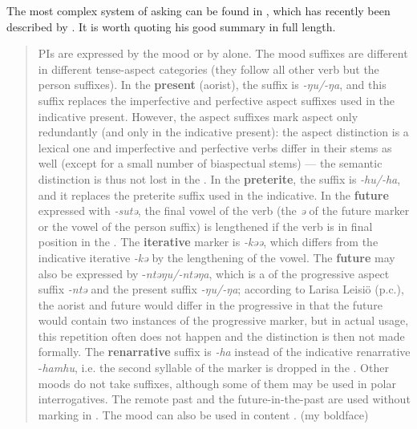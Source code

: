 \largerpage
The most complex system of asking  can be found in \textbf{}, which has recently been described by \citet[17]{Miestamo2011}. It is worth quoting his good summary in full length.

\newpage 
\begin{quote}
PIs are expressed by the  mood or by  alone. The  mood suffixes are different in different tense-aspect categories (they follow all other verb  but the person suffixes). In the \textbf{present} (aorist), the suffix is \textit{-ŋu/-ŋa}, and this suffix replaces the imperfective and perfective aspect suffixes used in the indicative present. However, the aspect suffixes mark aspect only redundantly (and only in the indicative present): the aspect distinction is a lexical one and imperfective and perfective verbs differ in their stems as well (except for a small number of biaspectual stems) — the semantic distinction is thus not lost in the . In the \textbf{preterite}, the  suffix is \textit{-hu/-ha}, and it replaces the preterite suffix used in the indicative. In the \textbf{future} expressed with \textit{-sutə}, the final vowel of the verb (the \textit{ə} of the future marker or the vowel of the person suffix) is lengthened if the verb is in final position in the . The  \textbf{iterative} marker is \textit{-kəə}, which differs from the indicative iterative \textit{-kə} by the lengthening of the vowel. The  \textbf{future} may also be expressed by -\textit{ntəŋu/-ntəŋa}, which is a  of the progressive aspect suffix \textit{-ntə} and the present  suffix \textit{-ŋu/-ŋa}; according to Larisa Leisiö (p.c.), the aorist and future would differ in the progressive  in that the future would contain two instances of the progressive marker, but in actual usage, this repetition often does not happen and the distinction is then not made formally. The  \textbf{renarrative} suffix is \textit{-ha} instead of the indicative renarrative -\textit{hamhu}, i.e. the second syllable of the marker is dropped in the . Other moods do not take  suffixes, although some of them may be used in polar interrogatives. The remote past and the future-in-the-past are used without  marking in . The  mood can also be used in content . (my boldface)
\end{quote}

